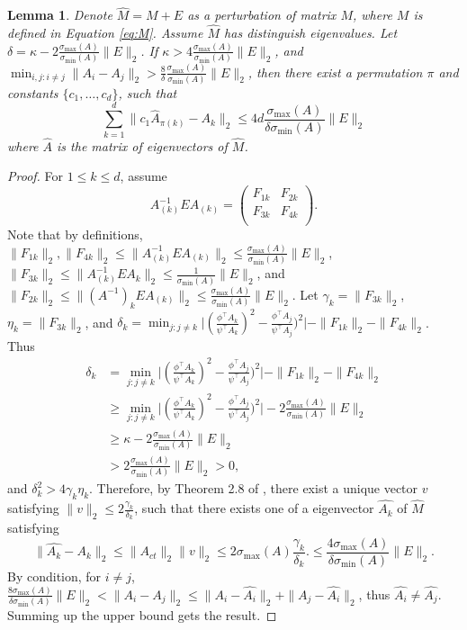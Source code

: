 \documentclass[english]{article} %
\providecommand{\lemmaname}{Lemma}
\providecommand{\lemmaname}{Lemma}
\theoremstyle{plain}
\theoremstyle{remark}
\theoremstyle{claim}
\theoremstyle{plain}
\newtheorem{lemma}[thm]{\protect\lemmaname}
\begin{document}
\begin{lemma}
\label{lem:eigenvectorvariation}
Denote $\widehat{M} = M+E$ as a perturbation of matrix $M$, where $M$ is defined in Equation \eqref{eq:M}. 
Assume $\widehat{M}$ has distinguish eigenvalues. Let $\delta = \kappa -  2 \frac{\sigma_{\max}(A)}{\sigma_{\min}(A)}\|E\|_2$. 
If $\kappa > 4 \frac{\sigma_{\max}(A)}{\sigma_{\min}(A)}\|E\|_2$, and $\min_{i,j:i\neq j} \|A_i - A_j\|_2 > \frac{8}{\delta}\frac{\sigma_{\max}(A)}{\sigma_{\min}(A) } \|E\|_2$, then there exist a permutation $\pi$ and constants $\{c_1,\ldots,c_d\}$, such that 
\[
\sum_{k=1}^{d}\| c_1\widehat{A}_{\pi(k)} - A_k\|_2 \le 4d  \frac{\sigma_{\max}(A)}{\delta \sigma_{\min}(A) } \|E\|_2
\]
where $\widehat{A}$ is the matrix of eigenvectors of $\widehat{M}$. 
\end{lemma}

\begin{proof}
For $1\le k\le d$, assume 
\[
A_{(k)}^{-1} E A_{(k)} =  
\left(
\begin{array}{cc}
F_{1k} & F_{2k}\\
F_{3k} & F_{4k} \\
\end{array} 
\right). 
\] 
Note that by definitions, $\|F_{1k}\|_2,\|F_{4k}\|_2\le\|A_{(k)}^{-1} E A_{(k)}\|_2\le\frac{\sigma_{\max}(A)}{\sigma_{\min}(A)}\|E\|_2$,
 $\|F_{3k}\|_2\le\|A_{(k)}^{-1}EA_{k}\|_2\le\frac{1}{\sigma_{\min}(A)}\|E\|_2$,
 and $\|F_{2k}\|_2\le\|(A^{-1})_kEA_{(k)}\|_2\le\frac{\sigma_{\max}(A)}{\sigma_{\min}(A)}\|E\|_2$.
Let $\gamma_k = \|F_{3k}\|_2$, $\eta_k = \|F_{3k}\|_2$, and $\delta_k = \min_{j: j\neq k} \vert (\frac{\phi^{\top}A_k}{\psi^{\top}A_k})^2 - \frac{\phi^{\top}A_j}{\psi^{\top}A_j})^2 \vert - \|F_{1k}\|_2 - \|F_{4k}\|_2$. Thus 
\begin{align*}
\delta_k & = \min_{j:j\neq k} \vert (\frac{\phi^{\top}A_k}{\psi^{\top}A_k})^2 - \frac{\phi^{\top}A_j}{\psi^{\top}A_j})^2 \vert - \|F_{1k}\|_2 - \|F_{4k}\|_2\\
	& \ge \min_{j:j\neq k} \vert (\frac{\phi^{\top}A_k}{\psi^{\top}A_k})^2 - \frac{\phi^{\top}A_j}{\psi^{\top}A_j})^2 \vert - 2 \frac{\sigma_{\max}(A)}{\sigma_{\min}(A)}\|E\|_2\\
	& \ge  \kappa -  2 \frac{\sigma_{\max}(A)}{\sigma_{\min}(A)}\|E\|_2\\
	& >  2 \frac{\sigma_{\max}(A)}{\sigma_{\min}(A)}\|E\|_2 >0,
\end{align*}
and $\delta_k^2 > 4\gamma_k\eta_k$. 
Therefore, by Theorem 2.8 of \citep{stewart1990matrix}, there exist a unique vector $v$ satisfying $\|v\|_2\le 2\frac{\gamma_k}{\delta_k}$, such that there exists one of a eigenvector $\widehat{A_k}$ of $\widehat{M}$ satisfying
 \[
 \|\widehat{A_k} - A_k\|_2 \le \|A_{ct}\|_2 \|v\|_2 \le 2\sigma_{\max}(A)\frac{\gamma_k}{\delta_k}.\le \frac{4\sigma_{\max}(A)}{\delta \sigma_{\min}(A) } \|E\|_2.
 \]
 By condition, for $i\neq j$,  $\frac{8\sigma_{\max}(A)}{\delta \sigma_{\min}(A) } \|E\|_2 < \|A_i - A_j\|_2\le \|A_i - \widehat{A_i}\|_2 + \|A_j - \widehat{A_i}\|_2$, thus $\widehat{A_i} \neq \widehat{A_j}$.  Summing up the upper bound gets the result. 
\end{proof}
\end{document}
